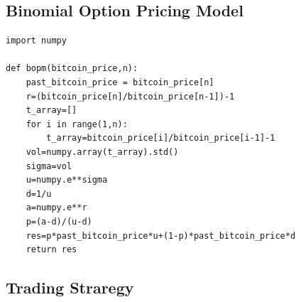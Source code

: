 \documentclass[12pt]{article}
\begin{document}
\subsection{Binomial Option Pricing Model}
\begin{lstlisting}
import numpy

def bopm(bitcoin_price,n):
    past_bitcoin_price = bitcoin_price[n]
    r=(bitcoin_price[n]/bitcoin_price[n-1])-1
    t_array=[]
    for i in range(1,n):
        t_array=bitcoin_price[i]/bitcoin_price[i-1]-1
    vol=numpy.array(t_array).std()
    sigma=vol   
    u=numpy.e**sigma
    d=1/u
    a=numpy.e**r
    p=(a-d)/(u-d)
    res=p*past_bitcoin_price*u+(1-p)*past_bitcoin_price*d
    return res
\end{lstlisting}
\subsection{Trading Straregy}
\end{document}
